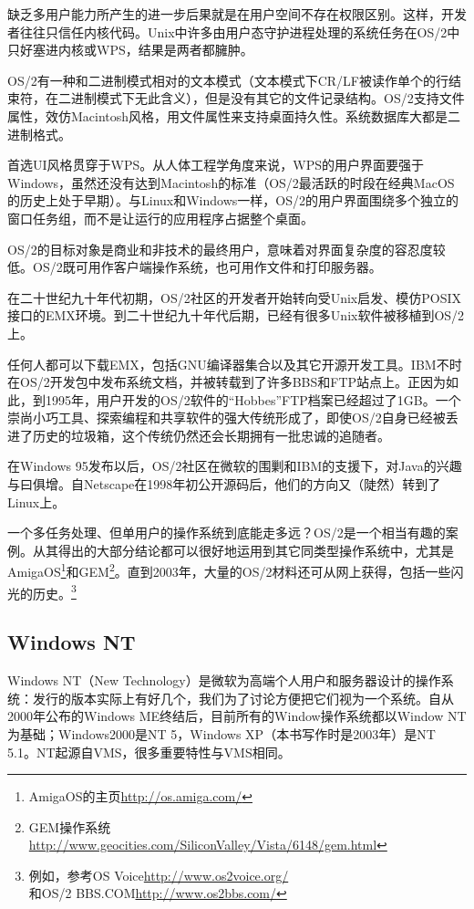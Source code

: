 \documentclass[11pt,oneside]{book}
\begin{document}
\begin{common-format}
缺乏多用户能力所产生的进一步后果就是在用户空间不存在权限区别。这样，开发者往往只信任内核代码。Unix中许多由用户态守护进程处理的系统任务在OS/2中只好塞进内核或WPS，结果是两者都臃肿。

OS/2有一种和二进制模式相对的文本模式（文本模式下CR/LF被读作单个的行结束符，在二进制模式下无此含义），但是没有其它的文件记录结构。OS/2支持文件属性，效仿Macintosh风格，用文件属性来支持桌面持久性。系统数据库大都是二进制格式。

首选UI风格贯穿于WPS。从人体工程学角度来说，WPS的用户界面要强于Windows，虽然还没有达到Macintosh的标准（OS/2最活跃的时段在经典MacOS的历史上处于早期）。与Linux和Windows一样，OS/2的用户界面围绕多个独立的窗口任务组，而不是让运行的应用程序占据整个桌面。

OS/2的目标对象是商业和非技术的最终用户，意味着对界面复杂度的容忍度较低。OS/2既可用作客户端操作系统，也可用作文件和打印服务器。

在二十世纪九十年代初期，OS/2社区的开发者开始转向受Unix启发、模仿POSIX接口的EMX环境。到二十世纪九十年代后期，已经有很多Unix软件被移植到OS/2上。

任何人都可以下载EMX，包括GNU编译器集合以及其它开源开发工具。IBM不时在OS/2开发包中发布系统文档，并被转载到了许多BBS和FTP站点上。正因为如此，到1995年，用户开发的OS/2软件的“Hobbes”FTP档案已经超过了1GB。一个崇尚小巧工具、探索编程和共享软件的强大传统形成了，即使OS/2自身已经被丢进了历史的垃圾箱，这个传统仍然还会长期拥有一批忠诚的追随者。

在Windows 95发布以后，OS/2社区在微软的围剿和IBM的支援下，对Java的兴趣与曰俱增。自Netscape在1998年初公开源码后，他们的方向又（陡然）转到了Linux上。

一个多任务处理、但单用户的操作系统到底能走多远？OS/2是一个相当有趣的案例。从其得出的大部分结论都可以很好地运用到其它同类型操作系统中，尤其是AmigaOS\footnote{AmigaOS的主页\href{http://os.amiga.com/}{http://os.amiga.com/}}和GEM\footnote{GEM操作系统\\ \href{http://www.geocities.com/SiliconValley/Vista/6148/gem.html}{http://www.geocities.com/SiliconValley/Vista/6148/gem.html}}。直到2003年，大量的OS/2材料还可从网上获得，包括一些闪光的历史。\footnote{例如，参考OS Voice\href{http://www.os2voice.org/}{http://www.os2voice.org/}\\和OS/2 BBS.COM\href{http://www.os2bbs.com/}{http://www.os2bbs.com/}}


\subsection{Windows NT}
Windows NT（New Technology）是微软为高端个人用户和服务器设计的操作系统：发行的版本实际上有好几个，我们为了讨论方便把它们视为一个系统。自从2000年公布的Windows ME终结后，目前所有的Window操作系统都以Window NT为基础；Windows2000是NT 5，Windows XP（本书写作时是2003年）是NT 5.1。NT起源自VMS，很多重要特性与VMS相同。


\end{common-format}
\end{document}
